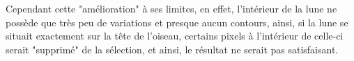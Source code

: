 Cependant cette "amélioration" à ses limites, en effet, l'intérieur de la lune ne possède que très peu de variations et presque aucun contours, ainsi, si la lune se situait exactement sur la tête de l'oiseau, certains pixels à l'intérieur de celle-ci serait "supprimé" de la sélection, et ainsi, le résultat ne serait pas satisfaisant.
